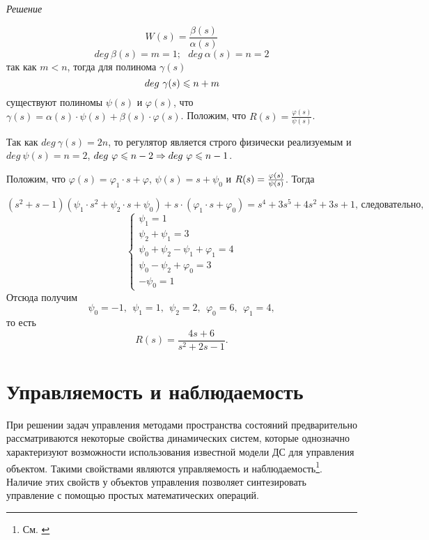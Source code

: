 \documentclass[../../TAU.tex]{subfiles}
\begin{document}
    \textit{Решение}
    {
        $$
            W(s)=\frac{\beta(s)}{\alpha(s)}
        $$
        $$
            deg\ \beta(s)=m=1;\ \ \ deg\ \alpha(s)=n=2
        $$
        так как $m<n$, тогда для полинома $\gamma(s)$
        $$
            deg\ \gamma(s)\leqslant n+m
        $$
        существуют полиномы $\psi(s)$ и $\varphi(s)$, что $\gamma(s)=\alpha(s)\cdot\psi(s)+\beta(s)\cdot\varphi(s)$.
        Положим, что $R(s)=\frac{\varphi(s)}{\psi(s)}$.


        Так как $deg\ \gamma(s)=2n$, то регулятор является строго физически реализуемым и $deg\ \psi(s)=n=2$, $deg\ \varphi\lse n-2\Rightarrow deg\ \varphi\lse n-1$.

        Положим, что $\varphi(s)=\varphi_1\cdot s+\varphi$, $\psi(s)=s+\psi_0$ и 
        $R(s)={\varphi(s)\over\psi(s)}$.
        Тогда

        $$
            (s^2+s-1)(\psi_1\cdot s^2+\psi_2\cdot s+\psi_0)+s\cdot(\varphi_1\cdot s+\varphi_0)=s^4+3s^5+4s^2+3s+1\text{, следовательно, }
        $$
        $$
        \begin{cases}
            \psi_1=1\\
            \psi_2+\psi_1=3\\
            \psi_0+\psi_2-\psi_1+\varphi_1=4\\
            \psi_0-\psi_2+\varphi_0=3\\
            -\psi_0=1
        \end{cases}
        $$
        Отсюда получим
        $$
        \psi_0=-1,\ \ \psi_1=1,\ \ \psi_2=2,\ \ \varphi_0=6,\ \ \varphi_1=4,
        $$
        то есть
        $$
            R(s)=\frac{4s+6}{s^2+2s-1}.
        $$
    }



\section[Управляемость и наблюдаемость]{Управляемость и наблюдаемость}

    При решении задач управления методами пространства состояний предварительно рассматриваются некоторые свойства динамических систем, которые однозначно характеризуют возможности использования известной модели ДС для управления объектом. 
    Такими свойствами являются управляемость и наблюдаемость\footnote{См. \cite[стр. 269]{voron}}. 
    Наличие этих свойств у объектов управления позволяет синтезировать управление с помощью простых математических операций.
    \cite[стр. 62]{yashin} 
\end{document}
